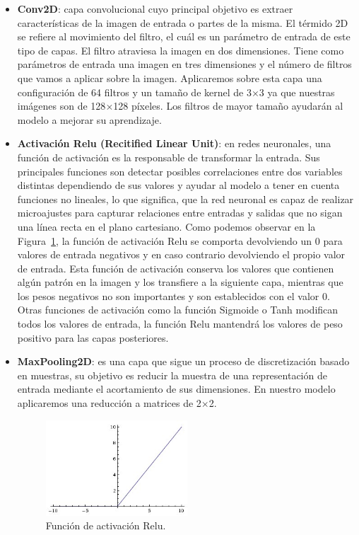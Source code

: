 \begin{itemize}
    \item \textbf{Conv2D}: capa convolucional cuyo principal objetivo es extraer características de la imagen de entrada o partes de la misma.
    El térmido 2D se refiere al movimiento del filtro, el cuál es un parámetro de entrada de este tipo de capas.
    El filtro atraviesa la imagen en dos dimensiones.
    Tiene como parámetros de entrada una imagen en tres dimensiones y el número de filtros que vamos a aplicar sobre la imagen.
    Aplicaremos sobre esta capa una configuración de 64 filtros y un tamaño de kernel de 3$\times$3 ya que nuestras imágenes son de 128$\times$128 píxeles. Los filtros de mayor tamaño ayudarán al modelo a mejorar su aprendizaje.
    \item \textbf{Activación Relu (Recitified Linear Unit)}: en redes neuronales, una función de activación es la responsable de transformar la entrada.
    Sus principales funciones son detectar posibles correlaciones entre dos variables distintas dependiendo de sus valores y ayudar al modelo a tener en cuenta funciones no lineales, lo que significa, que la red neuronal es capaz de realizar microajustes para capturar relaciones entre entradas y salidas que no sigan una línea recta en el plano cartesiano.
    Como podemos observar en la Figura~\ref{fig:Función de activación Relu}, la función de activación Relu se comporta devolviendo un 0 para valores de entrada negativos y en caso contrario devolviendo el propio valor de entrada.
    Esta función de activación conserva los valores que contienen algún patrón en la imagen y los transfiere a la siguiente capa, mientras que los pesos negativos no son importantes y son establecidos con el valor 0.
    Otras funciones de activación como la función Sigmoide o Tanh modifican todos los valores de entrada, la función Relu mantendrá los valores de peso positivo para las capas posteriores.
    \item \textbf{MaxPooling2D}: es una capa que sigue un proceso de discretización basado en muestras, su objetivo es reducir la muestra de una representación de entrada mediante el acortamiento de sus dimensiones.
    En nuestro modelo aplicaremos una reducción a matrices de 2$\times$2.

    \begin{figure}
        \centering
        \includegraphics[width=0.5\textwidth]{images/chapter2/relu.jpg}
        \caption{Función de activación Relu.}
        \label{fig:Función de activación Relu}
    \end{figure}


\end{itemize}
